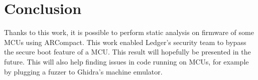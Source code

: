 \section{Conclusion}

Thanks to this work, it is possible to perform static analysis on
firmware of some MCUs using ARCompact. This work enabled Ledger's
security team to bypass the secure boot feature of a MCU. This result
will hopefully be presented in the future. This will also help finding
issues in code running on MCUs, for example by plugging a fuzzer to
Ghidra's machine emulator.


